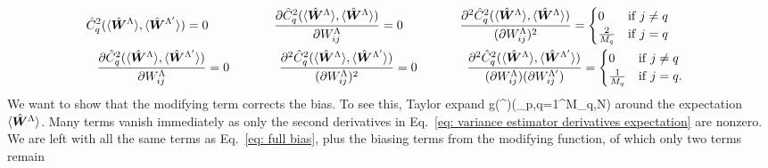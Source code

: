 \documentclass[%
 reprint,
 amsmath,amssymb,
 aps,nofootinbib,nobibnotes,onecolumn,prd
]{revtex4-2}
\begin{document}
\begin{gather}
\hat{C}^2_q(\langle \hat{\bm W}^\Lambda\rangle, \langle \hat{\bm W}^{\Lambda'}\rangle) = 0 \qquad\quad \;\qquad \frac{\partial \hat{C}^2_q(\langle \hat{\bm W}^\Lambda\rangle, \langle \hat{\bm W}^\Lambda\rangle) }{\partial W_{ij}^\Lambda} = 0
\qquad \qquad \;\;  \frac{\partial^2 \hat{C}^2_q(\langle \hat{\bm W}^\Lambda\rangle, \langle \hat{\bm W}^\Lambda\rangle)}{(\partial W_{ij}^\Lambda)^2} = \begin{cases}
0 & {\rm if} \; j \neq q \\
\frac{2}{M_q} & {\rm if}\; j = q
\end{cases} \quad\quad \nonumber \\ 
\frac{\partial \hat{C}^2_q(\langle \hat{\bm W}^\Lambda\rangle, \langle \hat{\bm W}^{\Lambda'}\rangle) }{\partial W_{ij}^\Lambda} = 0 \qquad \qquad  \frac{\partial^2 \hat{C}^2_q(\langle \hat{\bm W}^\Lambda\rangle, \langle \hat{\bm W}^{\Lambda'}\rangle)}{(\partial W_{ij}^\Lambda)^2} = 0 \qquad \qquad 
\frac{\partial^2 \hat{C}^2_q(\langle \hat{\bm W}^\Lambda\rangle, \langle \hat{\bm W}^{\Lambda'}\rangle)}{(\partial W_{ij}^\Lambda)(\partial W_{ij}^{\Lambda'})} = \begin{cases}
0 & {\rm if} \; j \neq q \\
\frac{1}{M_q} & {\rm if}\; j = q.
\end{cases} 
\label{eq: variance estimator derivatives expectation}
\end{gather}
We want to show that the modifying term corrects the bias.
To see this, Taylor expand
\beq
g(^{\Lambda})\exp\left(\sum_{p,q=1}^{M_q,N}\right)
\eeq
around the expectation $\langle \hat{\bm W}^\Lambda\rangle$. Many terms vanish immediately as only the second derivatives in Eq.~\ref{eq: variance estimator derivatives expectation} are nonzero. We are left with all the same terms as Eq.~\ref{eq: full bias}, plus the biasing terms from the modifying function, of which only two terms remain
\end{document}
